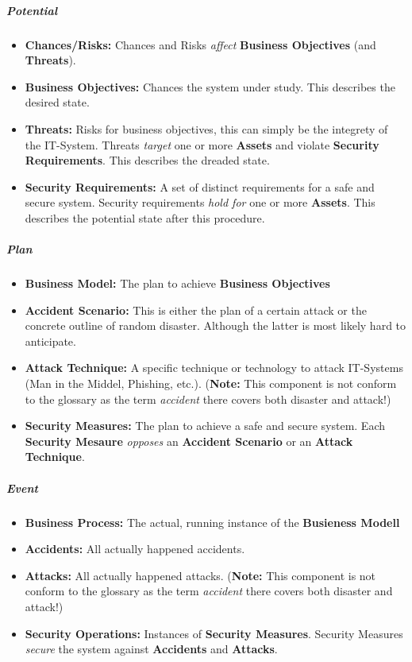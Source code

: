 \subparagraph{Potential}

\begin{itemize}

\item
  \textbf{Chances/Risks:} Chances and Risks \emph{affect}
  \textbf{Business Objectives} (and \textbf{Threats}).
\item
  \textbf{Business Objectives:} Chances the system under study. This
  describes the desired state.
\item
  \textbf{Threats:} Risks for business objectives, this can simply be
  the integrety of the IT-System. Threats \emph{target} one or more
  \textbf{Assets} and violate \textbf{Security Requirements}. This
  describes the dreaded state.
\item
  \textbf{Security Requirements:} A set of distinct requirements for a
  safe and secure system. Security requirements \emph{hold for} one or
  more \textbf{Assets}. This describes the potential state after this
  procedure.
\end{itemize}

\subparagraph{Plan}

\begin{itemize}

\item
  \textbf{Business Model:} The plan to achieve \textbf{Business
  Objectives}
\item
  \textbf{Accident Scenario:} This is either the plan of a certain
  attack or the concrete outline of random disaster. Although the latter
  is most likely hard to anticipate.
\item
  \textbf{Attack Technique:} A specific technique or technology to
  attack IT-Systems (Man in the Middel, Phishing, etc.). (\textbf{Note:}
  This component is not conform to the glossary as the term
  \emph{accident} there covers both disaster and attack!)
\item
  \textbf{Security Measures:} The plan to achieve a safe and secure
  system. Each \textbf{Security Mesaure} \emph{opposes} an
  \textbf{Accident Scenario} or an \textbf{Attack Technique}.
\end{itemize}

\subparagraph{Event}

\begin{itemize}

\item
  \textbf{Business Process:} The actual, running instance of the
  \textbf{Busieness Modell}
\item
  \textbf{Accidents:} All actually happened accidents.
\item
  \textbf{Attacks:} All actually happened attacks. (\textbf{Note:} This
  component is not conform to the glossary as the term \emph{accident}
  there covers both disaster and attack!)
\item
  \textbf{Security Operations:} Instances of \textbf{Security Measures}.
  Security Measures \emph{secure} the system against \textbf{Accidents}
  and \textbf{Attacks}.
\end{itemize}

